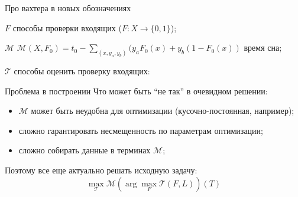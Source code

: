 \documentclass[14pt, fleqn, xcolor={dvipsnames, table}]{beamer}
\newenvironment{mydescription}[1]
  {\begin{list}{}%
   {\renewcommand\makelabel[1]{\color{blue}##1:\hfill}%
   \settowidth\labelwidth{\makelabel{#1}}%
   \setlength\leftmargin{\labelwidth}
   \addtolength\leftmargin{\labelsep}}}
  {\end{list}}
\begin{document}
\begin{frame}{Про вахтера в новых обозначениях}
\begin{mydescription}{$\mathcal{M}$}
  \item[$F$] способы проверки входящих ($F: X \to \{0,1\}$);
  \item[$\mathcal{M}$] $\mathcal{M}(X,F_0) = t_0 - \sum_{(x,y_a,y_b)} (y_a F_0(x) + y_b (1 - F_0(x))$ время сна;
  \item[$\mathcal{T}$] способы оценить проверку входящих:
\end{mydescription}
\end{frame}

\begin{frame}{Проблема в построении}
Что может быть ``не так'' в очевидном решении:
\begin{itemize}
  \item $\mathcal{M}$ может быть неудобна для оптимизации (кусочно-постоянная, например);
  \item сложно гарантировать несмещенность по параметрам оптимизации;
  \item сложно собирать данные в терминах $\mathcal{M}$;
\end{itemize} 
Поэтому все еще актуально решать исходную задачу:
$$
\max_{\mathcal{T}} \mathcal{M} \left(\arg\max_{F} \mathcal{T}(F, L)\right)(T)
$$
\end{frame}
\end{document}
